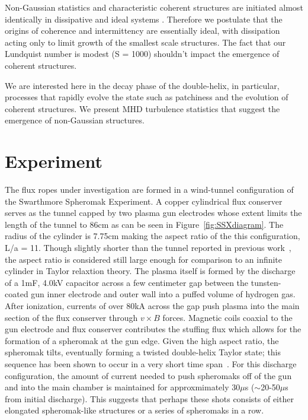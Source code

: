 \documentclass[12pt]{iopart}
\begin{document}
Non-Gaussian statistics and characteristic coherent structures are initiated almost identically in dissipative and ideal systems \cite{Wan09}. Therefore we postulate that the origins of coherence and intermittency are essentially ideal, with dissipation acting only to limit growth of the smallest scale structures.  The fact that our Lundquist number is modest (S = 1000) shouldn't impact the emergence of coherent structures.

We are interested here in the decay phase of the double-helix, in particular, processes that rapidly evolve the state such as patchiness and the evolution of coherent structures.  We present MHD turbulence statistics that suggest the emergence of non-Gaussian structures.


\section{Experiment}

The flux ropes under investigation are formed in a wind-tunnel configuration of the Swarthmore Spheromak Experiment. A copper cylindrical flux conserver serves as the tunnel capped by two plasma gun electrodes whose extent limits the length of the tunnel to 86cm as can be seen in Figure~\ref{fig:SSXdiagram}. The radius of the cylinder is 7.75cm making the aspect ratio of the this configuration, L/a = 11. Though slightly shorter than the tunnel reported in previous work~\cite{Gray13}, the aspect ratio is considered still large enough for comparison to an infinite cylinder in Taylor relaxtion theory. The plasma itself is formed by the discharge of a 1mF, 4.0kV capacitor across a few centimeter gap between the tunsten-coated gun inner electrode and outer wall into a puffed volume of hydrogen gas. After ionization, currents of over 80kA across the gap push plasma into the main section of the flux conserver through $v \times B$ forces. Magnetic coils coaxial to the gun electrode and flux conserver contributes the stuffing flux which allows for the formation of a spheromak at the gun edge. Given the high aspect ratio, the spheromak tilts, eventually forming a twisted double-helix Taylor state; this sequence has been shown to occur in a very short time span~\cite{Gray13}. For this discharge configuration, the amount of current needed to push spheromaks off of the gun and into the main chamber is maintained for approxmimately 30$\mu$s ($\sim$20-50$\mu$s from initial discharge). This suggests that perhaps these shots consists of either elongated spheromak-like structures or a series of spheromaks in a row.
\end{document}
